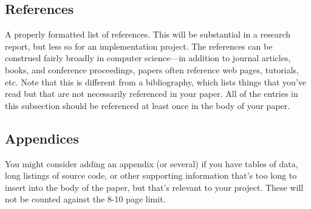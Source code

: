 \documentclass[sigconf,nonacm]{acmart}
\begin{document}
\subsection{References}
A properly formatted list of references. This will be substantial in a research report, but less so for an implementation project. The references can be construed fairly broadly in computer science—in addition to journal articles, books, and conference proceedings, papers often reference web pages, tutorials, etc. Note that this is different from a bibliography, which lists things that you’ve read but that are not necessarily referenced in your paper. All of the entries in this subsection should be referenced at least once in the body of your paper.

\subsection{Appendices}
You might consider adding an appendix (or several) if you have tables of data, long listings of source code, or other supporting information that’s too long to insert into the body of the paper, but that’s relevant to your project. These will not be counted against the 8-10 page limit.
\end{document}

